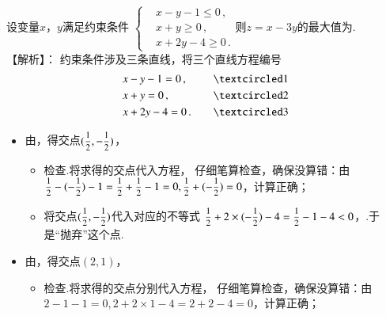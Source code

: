 \begin{exercise}
    \item %
      设变量$x$，$y$满足约束条件
      $\left\{\begin{aligned}
        &x-y-1\leqslant0\,,\\
        &x+y\geqslant0\,,\\
        &x+2y-4\geqslant0\,.
      \end{aligned}\right.$则$z=x-3y$的最大值为\tk.
        \\{\heiti 【解析】：}
          约束条件涉及三条直线，将三个直线方程编号
          \[\begin{aligned}
            &x-y-1=0\,,\quad &\circled{1}\\
            &x+y=0\,,\quad &\circled{2}\\
            &x+2y-4=0\,.\quad &\circled{3}
          \end{aligned}\]
          \begin{itemize}
            \item 由，得交点$(\mfrac12,-\mfrac12)$，
              \begin{itemize}
                \item 检查.{\kaishu 将求得的交点代入方程，
                  仔细笔算检查，确保没算错：由$\mfrac12-(-\mfrac12)-1=\mfrac12+\mfrac12-1=0,\mfrac12+(-\mfrac12)=0$，计算正确；}
                \item 将交点$(\mfrac12,-\mfrac12)$代入对应的不等式
                  $\mfrac12+2\times(-\mfrac12)-4=\mfrac12-1-4<0$，.于是“抛弃”这个点.
              \end{itemize}
            \item 由，得交点$(2,1)$，
              \begin{itemize}
                \item 检查.{\kaishu 将求得的交点分别代入方程，
                  仔细笔算检查，确保没算错：由$2-1-1=0,2+2\times1-4=2+2-4=0$，计算正确；}

\end{itemize}
\end{itemize}
\end{exercise}
